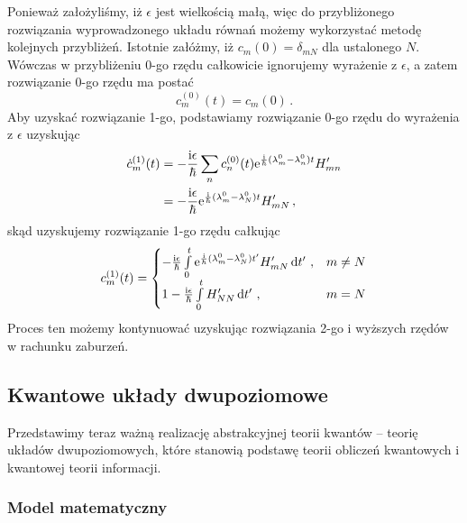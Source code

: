 \documentclass{myclass}
\begin{document}
Ponieważ założyliśmy, iż \(\epsilon\) jest wielkością małą, więc do przybliżonego rozwiązania
wyprowadzonego układu równań możemy wykorzystać metodę kolejnych przybliżeń. Istotnie załóżmy, iż
\(c_m(0) = \delta_{mN}\) dla ustalonego \(N\). Wówczas w przybliżeniu 0-go rzędu całkowicie
ignorujemy wyrażenie z \(\epsilon\), a zatem rozwiązanie 0-go rzędu ma postać
\begin{equation*}
    c_m^{(0)}(t) = c_m(0)\,.
\end{equation*}
Aby uzyskać rozwiązanie 1-go, podstawiamy rozwiązanie 0-go rzędu do wyrażenia z \(\epsilon\)
uzyskując
\begin{equation*}
    \begin{split}
        \dot{c}_m^{(1)}(t) &= -\frac{\mathrm{i}\epsilon}{\hbar}\sum_n c_n^{(0)}(t)\mathrm{e}^{\frac{\mathrm{i}}{\hbar}(\lambda_m^0-\lambda_n^0)t} H'_{mn} \\
        &= -\frac{\mathrm{i}\epsilon}{\hbar}\mathrm{e}^{\frac{\mathrm{i}}{\hbar}(\lambda_m^0-\lambda_N^0)t} H'_{mN}\,,
    \end{split}
\end{equation*}
skąd uzyskujemy rozwiązanie 1-go rzędu całkując
\begin{equation*}
    c_m^{(1)}(t) = \begin{cases}
        -\frac{\mathrm{i}\epsilon}{\hbar}\int\limits_0^t\mathrm{e}^{\frac{\mathrm{i}}{\hbar}(\lambda_m^0-\lambda_N^0)t'} H'_{mN} \dd{t'}\,,&m\neq N\\
        1 - \frac{\mathrm{i}\epsilon}{\hbar}\int\limits_0^tH'_{NN} \dd{t'}\,,&m=N
    \end{cases}
\end{equation*}
Proces ten możemy kontynuować uzyskując rozwiązania 2-go i wyższych rzędów w rachunku zaburzeń.

\newpage
\subsection{Kwantowe układy dwupoziomowe}

Przedstawimy teraz ważną realizację abstrakcyjnej teorii kwantów -- teorię układów dwupoziomowych,
które stanowią podstawę teorii obliczeń kwantowych i kwantowej teorii informacji.

\subsubsection{Model matematyczny}
\end{document}
